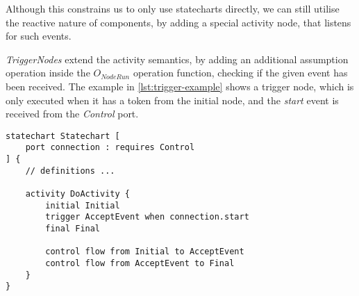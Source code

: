 Although this constrains us to only use statecharts directly, we can still utilise the reactive nature of components, by adding a special activity node, that listens for such events.

\emph{TriggerNodes} extend the activity semantics, by adding an additional assumption operation inside the \(	O_\mathit{NodeRun}\) operation function, checking if the given event has been received. The example in \autoref{lst:trigger-example} shows a trigger node, which is only executed when it has a token from the initial node, and the \emph{start} event is received from the \emph{Control} port.

\vspace{6mm}
\begin{lstlisting}[float, language=statechart, linewidth=0.75\textwidth, xleftmargin=0.25\textwidth, caption={An example trigger node accepting a start signal.}, label={lst:trigger-example}]
statechart Statechart [
	port connection : requires Control
] {
	// definitions ...
	
	activity DoActivity {
		initial Initial
		trigger AcceptEvent when connection.start
		final Final
		
		control flow from Initial to AcceptEvent
		control flow from AcceptEvent to Final
	}
}
\end{lstlisting}
